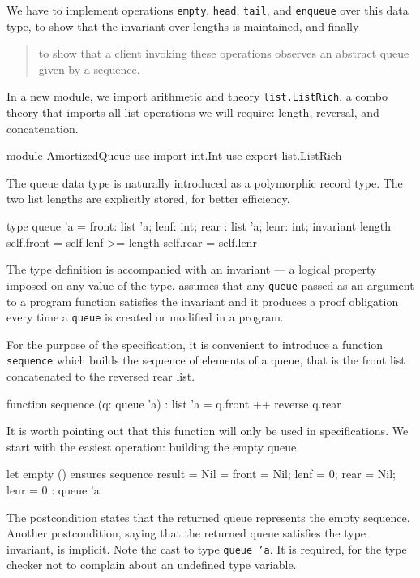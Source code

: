 We have to implement operations \texttt{empty}, \texttt{head},
\texttt{tail}, and \texttt{enqueue} over this data type,
to show that the invariant over lengths is maintained, and finally
\begin{quote}
  to show that a client invoking these operations
  observes an abstract queue given by a sequence.
\end{quote}
In a new module, we import arithmetic and theory
\texttt{list.ListRich}, a combo theory that imports all list
operations we will require: length, reversal, and concatenation.
\begin{whycode}
module AmortizedQueue
  use import int.Int
  use export list.ListRich
\end{whycode}
The queue data type is naturally introduced as a polymorphic record type.
The two list lengths are explicitly stored, for better efficiency.
\begin{whycode}
  type queue 'a = { front: list 'a; lenf: int;
                    rear : list 'a; lenr: int; }
  invariant {
    length self.front = self.lenf >= length self.rear = self.lenr }
\end{whycode}
The type definition is accompanied with an invariant ---
a logical property imposed on any value of the type.
\why assumes that any \texttt{queue} passed as an argument to
a program function satisfies the invariant and it produces
a proof obligation every time a \texttt{queue} is created
or modified in a program.

For the purpose of the specification, it is convenient to introduce a function
\texttt{sequence} which builds the sequence of elements of a queue, that
is the front list concatenated to the reversed rear list.
\begin{whycode}
  function sequence (q: queue 'a) : list 'a = q.front ++ reverse q.rear
\end{whycode}
It is worth pointing out that this function will only be used in
specifications.
We start with the easiest operation: building the empty queue.
\begin{whycode}
  let empty () ensures { sequence result = Nil }
  = { front = Nil; lenf = 0; rear = Nil; lenr = 0 } : queue 'a
\end{whycode}
The postcondition states that the returned queue represents
the empty sequence. Another postcondition, saying that the
returned queue satisfies the type invariant, is implicit.
Note the cast to type \texttt{queue 'a}. It is required, for the
type checker not to complain about an undefined type variable.

